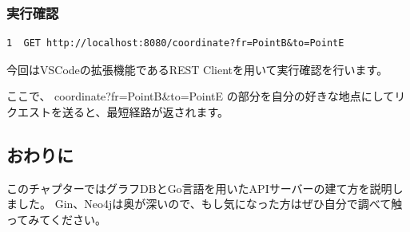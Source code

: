 \subsubsection{実行確認}

\begin{tcolorbox}[title=sample.http]
\begin{verbatim}
1  GET http://localhost:8080/coordinate?fr=PointB&to=PointE
\end{verbatim}
\end{tcolorbox}
今回はVSCodeの拡張機能であるREST Clientを用いて実行確認を行います。

ここで、 coordinate?fr=PointB\&to=PointE の部分を自分の好きな地点にしてリクエストを送ると、最短経路が返されます。

\subsection{おわりに}
このチャプターではグラフDBとGo言語を用いたAPIサーバーの建て方を説明しました。
Gin、Neo4jは奥が深いので、もし気になった方はぜひ自分で調べて触ってみてください。
